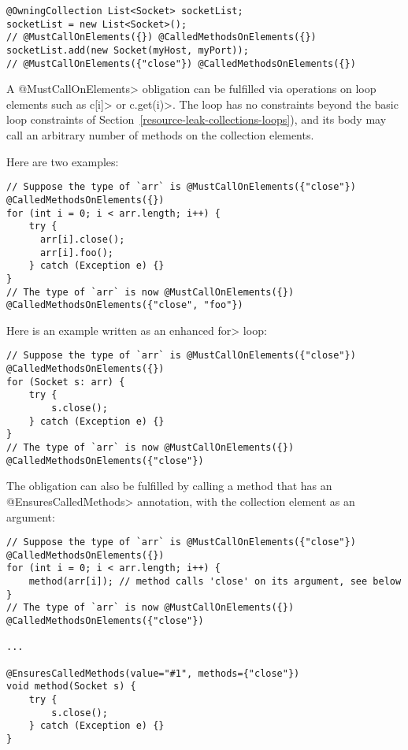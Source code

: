 \begin{verbatim}
@OwningCollection List<Socket> socketList;
socketList = new List<Socket>();
// @MustCallOnElements({}) @CalledMethodsOnElements({})
socketList.add(new Socket(myHost, myPort));
// @MustCallOnElements({"close"}) @CalledMethodsOnElements({})
\end{verbatim}



A \<@MustCallOnElements> obligation can be fulfilled via operations on loop
elements such as \<c[i]> or \<c.get(i)>.
The loop has no constraints beyond the basic loop constraints of
Section~\ref{resource-leak-collections-loops}), and its body may call an
arbitrary number of methods on the collection elements.

Here are two examples:

\begin{verbatim}
// Suppose the type of `arr` is @MustCallOnElements({"close"}) @CalledMethodsOnElements({})
for (int i = 0; i < arr.length; i++) {
    try {
      arr[i].close();
      arr[i].foo();
    } catch (Exception e) {}
}
// The type of `arr` is now @MustCallOnElements({}) @CalledMethodsOnElements({"close", "foo"})
\end{verbatim}

Here is an example written as an enhanced \<for> loop:

\begin{verbatim}
// Suppose the type of `arr` is @MustCallOnElements({"close"}) @CalledMethodsOnElements({})
for (Socket s: arr) {
    try {
        s.close();
    } catch (Exception e) {}
}
// The type of `arr` is now @MustCallOnElements({}) @CalledMethodsOnElements({"close"})
\end{verbatim}


The obligation can also be fulfilled by calling a method that has an
\<@EnsuresCalledMethods> annotation, with the collection element as an
argument:
\begin{verbatim}
// Suppose the type of `arr` is @MustCallOnElements({"close"}) @CalledMethodsOnElements({})
for (int i = 0; i < arr.length; i++) {
    method(arr[i]); // method calls 'close' on its argument, see below
}
// The type of `arr` is now @MustCallOnElements({}) @CalledMethodsOnElements({"close"})

...

@EnsuresCalledMethods(value="#1", methods={"close"})
void method(Socket s) {
    try {
        s.close();
    } catch (Exception e) {}
}
\end{verbatim}


